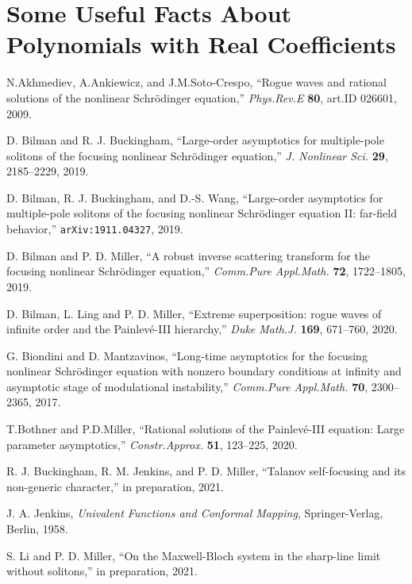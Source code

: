 \documentclass[11pt]{amsart}
\theoremstyle{definition}
\theoremstyle{remark}
\begin{document}
\section{Some Useful Facts About Polynomials with Real Coefficients}
\label{A:Sturm}


\begin{thebibliography}{99}
N.\@ Akhmediev, A.\@ Ankiewicz, and J.\@ M.\@ Soto-Crespo, ``Rogue waves and rational solutions of the nonlinear Schr\"odinger equation,'' \textit{Phys.\@ Rev.\@ E} \textbf{80}, art.ID 026601, 2009.

D. Bilman and R. J. Buckingham, 
``Large-order asymptotics for multiple-pole solitons of the focusing nonlinear Schr\"odinger equation,'' 
\textit{J. Nonlinear Sci.\@} \textbf{29}, 2185--2229, 2019. 

 D. Bilman, R. J. Buckingham, and D.-S. Wang, ``Large-order asymptotics for multiple-pole solitons of the focusing nonlinear Schr\"odinger equation II: far-field behavior,'' \texttt{arXiv:1911.04327}, 2019. 

 D. Bilman and P. D. Miller, ``A robust inverse scattering transform for the focusing nonlinear Schr\"odinger equation,'' \textit{Comm.\@ Pure Appl.\@ Math.\@} \textbf{72}, 1722--1805, 2019.

 D. Bilman, L. Ling and P. D. Miller, ``Extreme superposition:  rogue waves of infinite order and the Painlev\'e-III hierarchy,'' \textit{Duke Math.\@ J.\@} \textbf{169}, 671--760, 2020.

 G. Biondini and D. Mantzavinos, 
``Long-time asymptotics for the focusing nonlinear Schr\"odinger equation with nonzero boundary conditions at infinity and asymptotic stage of modulational instability,'' 
\textit{Comm.\@ Pure Appl.\@ Math.\@} \textbf{70}, 2300--2365, 2017.

 T.\@ Bothner and P.\@ D.\@ Miller, ``Rational solutions of the Painlev\'e-III equation: Large parameter asymptotics,'' \textit{Constr.\@ Approx.\@} \textbf{51}, 123--225, 2020.

 R. J. Buckingham, R. M. Jenkins, and P. D. Miller, ``Talanov self-focusing and its non-generic character,'' in preparation, 2021.

 J. A. Jenkins, \textit{Univalent Functions and Conformal Mapping}, Springer-Verlag, Berlin, 1958.

 S. Li and P. D. Miller, ``On the Maxwell-Bloch system in the sharp-line limit without solitons,'' in preparation, 2021.


\end{thebibliography}
\end{document}
